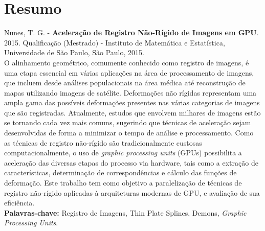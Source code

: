 \documentclass[11pt,twoside,a4paper]{book}
\begin{document}



\chapter*{Resumo}

\noindent Nunes, T. G. - \textbf{Aceleração de Registro Não-Rígido de Imagens em GPU}.
2015.
Qualificação (Mestrado) - Instituto de Matemática e Estatística,
Universidade de São Paulo, São Paulo, 2015.
\\

O alinhamento geométrico, comumente conhecido como registro de imagens, é uma etapa essencial em várias
aplicações na área de processamento de imagens, que incluem desde análises populacionais na área
médica até reconstrução de mapas utilizando imagens de satélite. Deformações não rígidas representam
uma ampla gama das possíveis deformações presentes nas várias categorias de imagens que são registradas.
Atualmente, estudos que envolvem milhares de imagens estão se tornando cada vez mais comuns, sugerindo
que técnicas de aceleração sejam desenvolvidas de forma a minimizar o
tempo de análise e processamento. Como as técnicas de registro não-rígido são tradicionalmente custosas
computacionalmente, o uso de \textit{graphic processing units} (GPUs) possibilita a
aceleração das diversas etapas do processo via hardware, tais como a extração de características,
determinação de correspondências e cálculo das funções de deformação. Este trabalho
tem como objetivo a paralelização de técnicas de registro não-rígido aplicadas à arquiteturas modernas de
GPU, e avaliação de sua eficiência.
\\

\noindent \textbf{Palavras-chave:} Registro de Imagens, Thin Plate Splines, Demons, \textit{Graphic Processing Units}.

\end{document}
